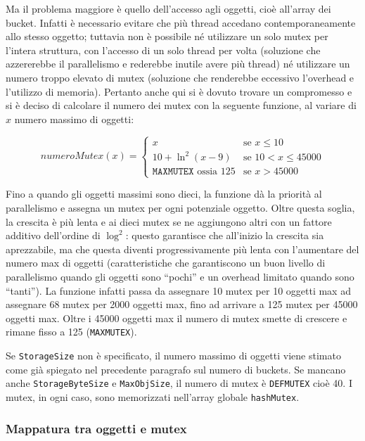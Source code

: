 \documentclass[a4paper,12pt]{article}
\begin{document}
Ma il problema maggiore è quello dell'accesso agli oggetti, cioè all'array dei bucket. Infatti è necessario evitare che più thread accedano contemporaneamente allo stesso oggetto; tuttavia non è possibile né utilizzare un solo mutex per l'intera struttura, con l'accesso di un solo thread per volta (soluzione che azzererebbe il parallelismo e rederebbe inutile avere più thread) né utilizzare un numero troppo elevato di mutex (soluzione che renderebbe eccessivo l'overhead e l'utilizzo di memoria). Pertanto anche qui si è dovuto trovare un compromesso e si è deciso di calcolare il numero dei mutex con la seguente funzione, al variare di $x$ numero massimo di oggetti:

\[
numeroMutex(x) =
  \begin{cases}
    x					&	\text{se } x \le 10\\
    10 + \ln^2(x-9) 			&	\text{se } 10 < x \le 45000\\
    \texttt{MAXMUTEX} \text{ ossia 125}	&	\text{se } x > 45000
  \end{cases}
\]

Fino a quando gli oggetti massimi sono dieci, la funzione dà la priorità al parallelismo e assegna un mutex per ogni potenziale oggetto. Oltre questa soglia, la crescita è più lenta e ai dieci mutex se ne aggiungono altri con un fattore additivo dell'ordine di $\log^2$: questo garantisce che all'inizio la crescita sia aprezzabile, ma che questa diventi progressivamente più lenta con l'aumentare del numero max di oggetti (caratteristiche che garantiscono un buon livello di parallelismo quando gli oggetti sono ``pochi'' e un overhead limitato quando sono ``tanti''). La funzione infatti passa da assegnare 10 mutex per 10 oggetti max ad assegnare 68 mutex per 2000 oggetti max, fino ad arrivare a 125 mutex per 45000 oggetti max. Oltre i 45000 oggetti max il numero di mutex smette di crescere e rimane fisso a 125 (\texttt{MAXMUTEX}).

Se \texttt{StorageSize} non è specificato, il numero massimo di oggetti viene stimato come già spiegato nel precedente paragrafo sul numero di buckets. Se mancano anche \texttt{StorageByteSize} e \texttt{MaxObjSize}, il numero di mutex è \texttt{DEFMUTEX} cioè 40. I mutex, in ogni caso, sono memorizzati nell'array globale \texttt{hashMutex}.

\subsubsection*{ Mappatura tra oggetti e mutex }
\end{document}
